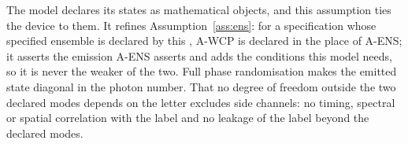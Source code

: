 
The model declares its states as mathematical objects, and this assumption
ties the device to them. It refines Assumption~\ref{ass:ens}: for a
specification whose specified ensemble is declared by this , A-WCP is declared in the place of A-ENS; it asserts the emission A-ENS
asserts and adds the conditions this model needs, so it is never the weaker of
the two. Full phase randomisation makes the emitted state diagonal in the
photon number. That no degree of freedom outside the two declared modes
depends on the letter excludes side channels: no timing, spectral or spatial
correlation with the label and no leakage of the label beyond the declared
modes.

